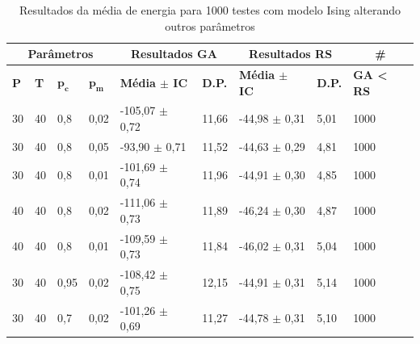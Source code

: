 \begin{table}[htb]
	\centering
	\begin{tabular}{|l|l|l|l|l|l|l|l|l|}
		\hline
		\multicolumn{4}{|c|}{\textbf{Parâmetros}}                                                    & \multicolumn{2}{c|}{\textbf{Resultados GA}}                                        & \multicolumn{2}{c|}{\textbf{Resultados RS}}                                        & \multicolumn{1}{c|}{\textbf{\#}}                      \\ \hline
		\textbf{P} & \textbf{T} & $\bm{p_c}$ & $\bm{p_m}$ & \textbf{Média $\pm$ IC} & \textbf{D.P.} & \textbf{Média $\pm$ IC} & \textbf{D.P.} & \textbf{GA < RS} \\ \hline
		30                          & 40                          & 0,8        & 0,02       & -105,07 $\pm$ 0,72                           & 11,66                          & -44,98 $\pm$ 0,31                            & 5,01                           & 1000                                      \\ \hline
		30                          & 40                          & 0,8        & 0,05       & -93,90 $\pm$ 0,71                            & 11,52                          & -44,63 $\pm$ 0,29                            & 4,81                           & 1000                                      \\ \hline
		30                          & 40                          & 0,8        & 0,01       & -101,69 $\pm$ 0,74                           & 11,96                          & -44,91 $\pm$ 0,30                            & 4,85                           & 1000                                      \\ \hline
		40                          & 40                          & 0,8        & 0,02       & -111,06 $\pm$ 0,73                           & 11,89                          & -46,24 $\pm$ 0,30                            & 4,87                           & 1000                                      \\ \hline
		40                          & 40                          & 0,8        & 0,01       & -109,59 $\pm$ 0,73                           & 11,84                          & -46,02 $\pm$ 0,31                            & 5,04                           & 1000                                      \\ \hline
		30                          & 40                          & 0,95       & 0,02       & -108,42 $\pm$ 0,75                           & 12,15                          & -44,91 $\pm$ 0,31                            & 5,14                           & 1000                                      \\ \hline
		30                          & 40                          & 0,7        & 0,02       & -101,26 $\pm$ 0,69                           & 11,27                          & -44,78 $\pm$ 0,31                            & 5,10                           & 1000                                      \\ \hline
	\end{tabular}
	\caption{Resultados da média de energia para 1000 testes com modelo Ising alterando outros parâmetros}
	\label{tab:resultados_teste3}
\end{table}

